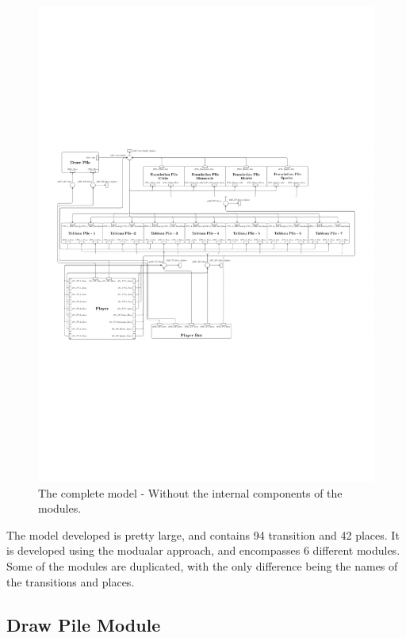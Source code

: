\documentclass[runningheads,a4paper]{llncs}
\begin{document}
\begin{figure}
	\label{fig:full_vertical}
	\includegraphics[trim=40 100 100 310,angle=90,scale=1.4]{images/overallViewPdf}
	\caption{The complete model - Without the internal components of the modules.}
\end{figure}
The model developed is pretty large, and contains 94 transition and 42 places. It is developed using the modualar approach, and encompasses 6 different modules. Some of the modules are duplicated, with the only difference being the names of the transitions and places.
\newline

\subsection{Draw Pile Module}
\end{document}
